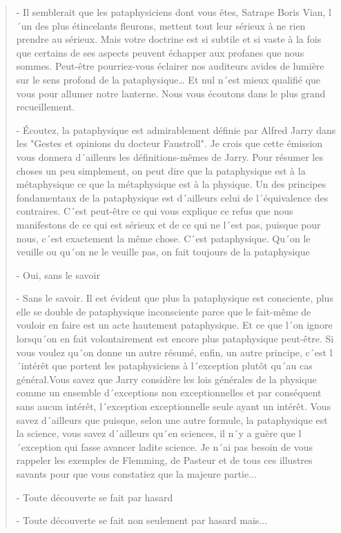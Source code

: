 {\small
\begin{quotation}
- Il semblerait que les pataphysiciens dont vous êtes, Satrape Boris Vian,
l´un des plus étincelants fleurons, mettent tout leur sérieux à ne rien prendre
au sérieux. Mais votre doctrine est si subtile et si vaste à la fois que certains
de ses aspects peuvent échapper aux profanes que nous sommes. Peut-être pourriez-vous
éclairer nos auditeurs avides de lumière sur le sens profond de la pataphysique\ldots
Et nul n´est mieux qualifié que vous pour allumer notre lanterne. Nous vous écoutons
dans le plus grand recueillement.

- Écoutez, la pataphysique est admirablement définie par Alfred Jarry dans les
"Gestes et opinions du docteur Faustroll". Je crois que cette émission vous donnera
d´ailleurs les définitions-mêmes de Jarry. Pour résumer les choses un peu simplement,
on peut dire que la pataphysique est à la métaphysique ce que la métaphysique est à
la physique. Un des principes fondamentaux de la pataphysique est d´ailleurs celui
de l´équivalence des contraires. C´est peut-être ce qui vous explique ce refus que
nous manifestons de ce qui est sérieux et de ce qui ne l´est pas, puisque pour nous,
c´est exactement la même chose. C´est pataphysique. Qu´on le veuille ou qu´on ne le
veuille pas, on fait toujours de la pataphysique

- Oui, sans le savoir

- Sans le savoir. Il est évident que plus la pataphysique est consciente, plus elle
se double de pataphysique inconsciente parce que le fait-même de vouloir en faire
est un acte hautement pataphysique. Et ce que l´on ignore lorsqu´on en fait volontairement
est encore plus pataphysique peut-être. Si vous voulez qu´on donne un autre résumé,
enfin, un autre principe, c´est l´intérêt que portent les pataphysiciens à l´exception
plutôt qu´au cas général.Vous savez que Jarry considère les lois générales de la physique
comme un ensemble d´exceptions non exceptionnelles et par conséquent sans aucun intérêt,
l´exception exceptionnelle seule ayant un intérêt. Vous savez d´ailleurs que puisque,
selon une autre formule, la pataphysique est la science, vous savez d´ailleurs qu´en
sciences, il n´y a guère que l´exception qui fasse avancer ladite science. Je n´ai
pas besoin de vous rappeler les exemples de Flemming, de Pasteur et de tous ces illustres
savants pour que vous constatiez que la majeure partie...

- Toute découverte se fait par hasard

- Toute découverte se fait non seulement par hasard mais...


\end{quotation}}
